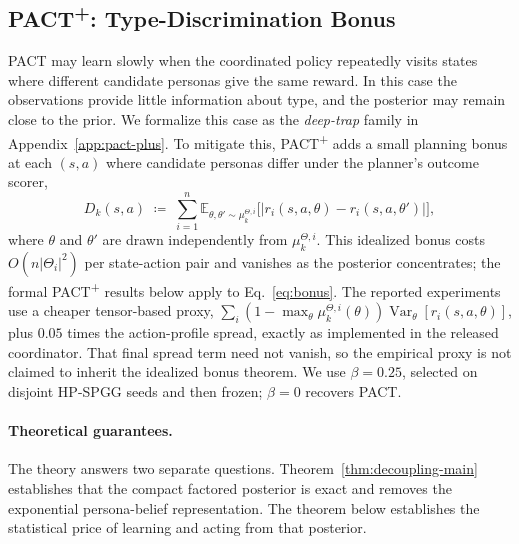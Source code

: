 \documentclass[letterpaper]{article} %
\begin{document}
\subsection{PACT\textsuperscript{+}: Type-Discrimination Bonus}
\label{sec:pact-plus-algo}

PACT may learn slowly when the coordinated policy repeatedly visits states where different candidate personas give the same reward. In this case the observations provide little information about type, and the posterior may remain close to the prior. We formalize this case as the \emph{deep-trap} family in Appendix~\ref{app:pact-plus}. To mitigate this, PACT\textsuperscript{+} adds a small planning bonus at each $(s,a)$ where candidate personas differ under the planner's outcome scorer,
\begin{equation}
\label{eq:bonus}
D_k(s,a) \;\coloneqq\; \sum_{i=1}^n \mathbb{E}_{\theta, \theta' \sim \mu_k^{\Theta,i}}\!\big[|r_i(s,a,\theta) - r_i(s,a,\theta')|\big],
\end{equation}
where $\theta$ and $\theta'$ are drawn independently from $\mu_k^{\Theta,i}$. This idealized bonus costs $O(n|\Theta_i|^2)$ per state-action pair and vanishes as the posterior concentrates; the formal PACT\textsuperscript{+} results below apply to Eq.~\eqref{eq:bonus}. The reported experiments use a cheaper tensor-based proxy, $\sum_i(1-\max_\theta\mu_k^{\Theta,i}(\theta))\operatorname{Var}_\theta[r_i(s,a,\theta)]$, plus $0.05$ times the action-profile spread, exactly as implemented in the released coordinator. That final spread term need not vanish, so the empirical proxy is not claimed to inherit the idealized bonus theorem. We use $\beta=0.25$, selected on disjoint HP-SPGG seeds and then frozen; $\beta=0$ recovers PACT.

\paragraph{Theoretical guarantees.}

The theory answers two separate questions. Theorem~\ref{thm:decoupling-main} establishes that the compact factored posterior is exact and removes the exponential persona-belief representation. The theorem below establishes the statistical price of learning and acting from that posterior.
\end{document}
